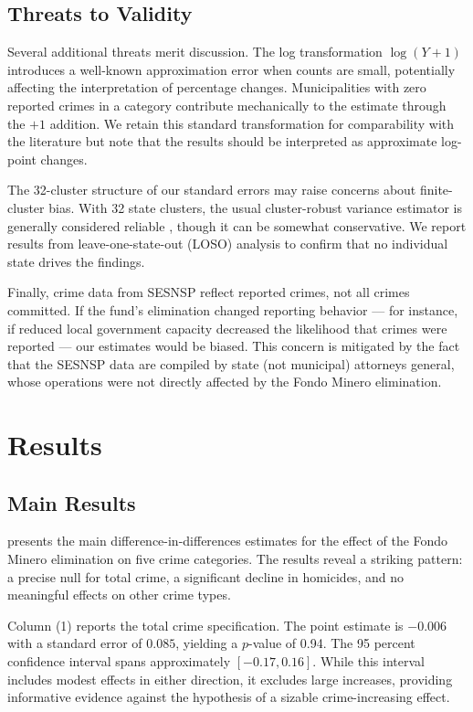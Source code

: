 \documentclass[12pt]{article}
\begin{document}
\subsection{Threats to Validity}

Several additional threats merit discussion. The log transformation $\log(Y + 1)$ introduces a well-known approximation error when counts are small, potentially affecting the interpretation of percentage changes. Municipalities with zero reported crimes in a category contribute mechanically to the estimate through the $+1$ addition. We retain this standard transformation for comparability with the literature but note that the results should be interpreted as approximate log-point changes.

The 32-cluster structure of our standard errors may raise concerns about finite-cluster bias. With 32 state clusters, the usual cluster-robust variance estimator is generally considered reliable \citep{roth2023whats}, though it can be somewhat conservative. We report results from leave-one-state-out (LOSO) analysis to confirm that no individual state drives the findings.

Finally, crime data from SESNSP reflect reported crimes, not all crimes committed. If the fund's elimination changed reporting behavior --- for instance, if reduced local government capacity decreased the likelihood that crimes were reported --- our estimates would be biased. This concern is mitigated by the fact that the SESNSP data are compiled by state (not municipal) attorneys general, whose operations were not directly affected by the Fondo Minero elimination.


\section{Results}

\subsection{Main Results}

 presents the main difference-in-differences estimates for the effect of the Fondo Minero elimination on five crime categories. The results reveal a striking pattern: a precise null for total crime, a significant decline in homicides, and no meaningful effects on other crime types.

Column (1) reports the total crime specification. The point estimate is $-0.006$ with a standard error of $0.085$, yielding a $p$-value of 0.94. The 95 percent confidence interval spans approximately $[-0.17, 0.16]$. While this interval includes modest effects in either direction, it excludes large increases, providing informative evidence against the hypothesis of a sizable crime-increasing effect.
\end{document}
